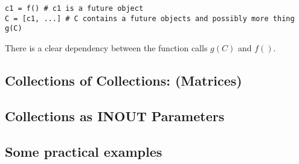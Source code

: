 \begin{verbatim}
c1 = f() # c1 is a future object
C = [c1, ...] # C contains a future objects and possibly more thing
g(C)
\end{verbatim}
There is a clear dependency between the function calls $g(C)$ and $f()$.

\subsection{Collections of Collections: (Matrices)}
\label{subsec:col_depth}

\subsection{Collections as INOUT Parameters}
\label{subsec:col_inout}

\subsection{Some practical examples}
\label{subsec:col_examples}
